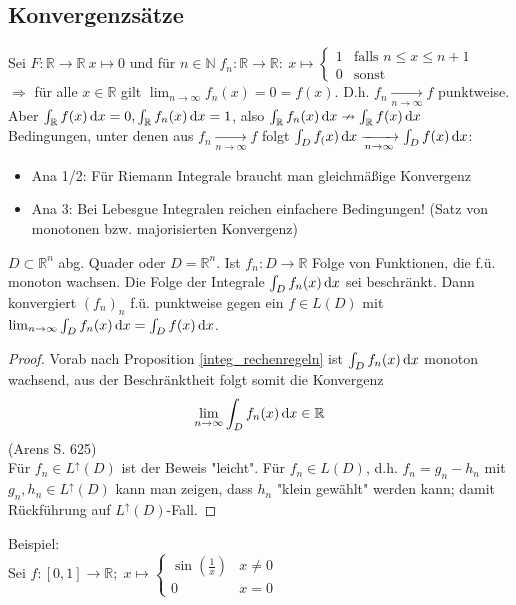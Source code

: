 \subsection{Konvergenzsätze}
Sei $F:\mathbb{R}\to\mathbb{R}\ x\mapsto 0$ und für $n\in\mathbb{N}\; f_n\colon\mathbb{R}\to\mathbb{R}\colon\ x\mapsto\left\{\begin{matrix}
	1 & \text{falls }n\leq x\leq n+1\\
	0 & \text{sonst}
\end{matrix}\right.$\\
$\Rightarrow$ für alle $x\in\mathbb{R}$ gilt $\lim_{n\to\infty}f_n(x)=0=f(x)$. D.h. $f_n\xrightarrow[n\to\infty]{}f$ punktweise.\\
Aber $\int_{\mathbb{R}} f(x) \,\text{d}x = 0, \int_{\mathbb{R}} f_n(x) \,\text{d}x = 1$, also $\int_{\mathbb{R}} f_n(x) \,\text{d}x\nrightarrow\int_{\mathbb{R}} f(x) \,\text{d}x$\\
Bedingungen, unter denen aus $f_n\xrightarrow[n\to\infty]{}f$ folgt $\int_{D} f_(x) \,\text{d}x\xrightarrow[n\to\infty]{}\int_{D} f(x) \,\text{d}x$:\\
\begin{itemize}
    \item Ana 1/2: Für Riemann Integrale braucht man gleichmäßige Konvergenz
    \item Ana 3: Bei Lebesgue Integralen reichen einfachere Bedingungen! (Satz von monotonen bzw. majorisierten Konvergenz)
\end{itemize}
\begin{satz}
    $D\subset\mathbb{R}^n$ abg. Quader oder $D=\mathbb{R}^n$. Ist $f_n\colon D\to\mathbb{R}$ Folge von Funktionen, die f.ü. monoton wachsen. Die Folge der Integrale $\int_{D} f_n(x) \,\text{d}x$ sei beschränkt. Dann konvergiert $(f_n)_n$ f.ü. punktweise gegen ein $f\in L(D)$ mit $\lim_{n\to\infty}\int_{D} f_n(x) \,\text{d}x=\int_{D} f(x) \,\text{d}x$.
\end{satz}
\begin{proof}
    Vorab nach Proposition \ref{integ_rechenregeln} ist $\int_{D} f_n(x) \,\text{d}x$ monoton wachsend, aus der Beschränktheit folgt somit die Konvergenz 
    \[
        \lim_{n\to\infty}\int_{D} f_n(x) \,\text{d}x\in\mathbb{R}
    \]
    (Arens S. 625)\\
    Für $f_n\in L^\uparrow(D)$ ist der Beweis "leicht". Für $f_n\in L(D)$, d.h. $f_n=g_n-h_n$ mit $g_n,h_n\in L^\uparrow(D)$ kann man zeigen, dass $h_n$ "klein gewählt" werden kann; damit Rückführung auf $L^\uparrow(D)$-Fall.
\end{proof}
Beispiel:\\
Sei $f\colon [0,1]\to\mathbb{R};\; x\mapsto\left\{\begin{matrix}
    \sin\left(\frac{1}{x}\right)& x\neq 0\\
    0 & x = 0
\end{matrix}\right.$\\
